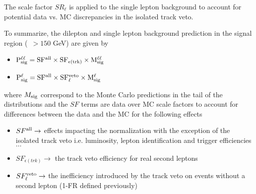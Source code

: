 The scale factor $SR_{\ell}$ is applied to the single lepton background to account for potential data vs. MC discrepancies 
in the isolated track veto.

To summarize, the dilepton and single lepton background prediction in the signal region (\mt\ $>150$ GeV) are given by

\begin{itemize}
\item $\rm{P}^{\ell\ell}_{\rm{sig}} = SF^{\rm{all}} \times SF_{\epsilon(trk)} \times M^{\ell \ell}_{\rm{sig}}$
\item $\rm{P}^{\ell}_{\rm{sig}} = SF^{\rm{all}} \times SF_{\ell}^{\rm{veto}} \times M^{\ell}_{\rm{sig}}$
\end{itemize}

where $M_{\rm{sig}}$ correspond to the Monte Carlo predictions in the tail of the distributions and the $SF$ terms are data over MC scale factors to account 
for differences between the data and the MC for the following effects

\begin{itemize}
\item $SF^{\rm{all}} \rightarrow $ effects impacting the normalization with the exception of the isolated track veto i.e. luminosity, 
lepton identification and trigger efficiencies $\dots$
\item $SF_{\epsilon(trk)} \rightarrow $ the track veto efficiency for real second leptons
\item $SF_{\ell}^{\rm{veto}} \rightarrow $ the inefficiency introduced by the track veto on events without a second lepton (1-FR defined previously)
\end{itemize}





